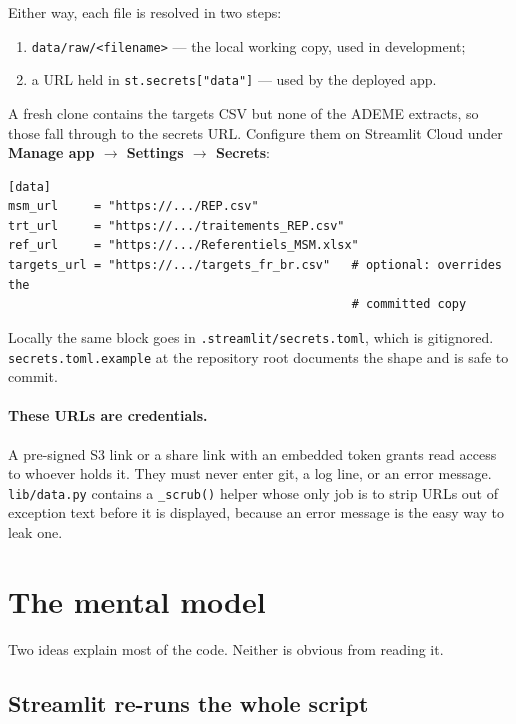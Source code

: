 \documentclass[11pt,a4paper]{article}
\newcommand{\file}[1]{\texttt{#1}}
\begin{document}
Either way, each file is resolved in two steps:

\begin{enumerate}
  \item \file{data/raw/<filename>} --- the local working copy, used in
        development;
  \item a URL held in \file{st.secrets["data"]} --- used by the deployed app.
\end{enumerate}

A fresh clone contains the targets CSV but none of the ADEME extracts, so those
fall through to the secrets URL. Configure them on Streamlit Cloud under
\textbf{Manage app $\rightarrow$ Settings $\rightarrow$ Secrets}:

\begin{lstlisting}
[data]
msm_url     = "https://.../REP.csv"
trt_url     = "https://.../traitements_REP.csv"
ref_url     = "https://.../Referentiels_MSM.xlsx"
targets_url = "https://.../targets_fr_br.csv"   # optional: overrides the
                                                # committed copy
\end{lstlisting}

Locally the same block goes in \file{.streamlit/secrets.toml}, which is
gitignored. \file{secrets.toml.example} at the repository root documents the
shape and is safe to commit.

\paragraph{These URLs are credentials.} A pre-signed S3 link or a share link
with an embedded token grants read access to whoever holds it. They must never
enter git, a log line, or an error message. \file{lib/data.py} contains a
\file{\_scrub()} helper whose only job is to strip URLs out of exception text
before it is displayed, because an error message is the easy way to leak one.

\section{The mental model}\label{sec:model}

Two ideas explain most of the code. Neither is obvious from reading it.

\subsection{Streamlit re-runs the whole script}
\end{document}
